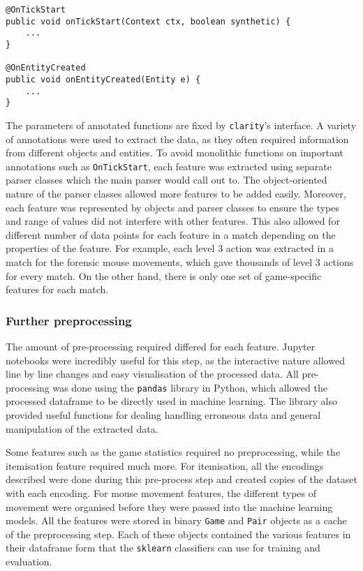 \documentclass[Report.tex]{subfiles}
\begin{document}
\begin{lstlisting}[caption=Annotations and function definitions for parsing must adhere to \texttt{clarity}'s interface.]
@OnTickStart
public void onTickStart(Context ctx, boolean synthetic) {
    ...
}

@OnEntityCreated
public void onEntityCreated(Entity e) {
    ...
}
\end{lstlisting}

The parameters of annotated functions are fixed by \texttt{clarity}'s interface. A variety of annotations were used to extract the data, as they often required information from different objects and entities. To avoid monolithic functions on important annotations such as \texttt{OnTickStart}, each feature was extracted using separate parser classes which the main parser would call out to. The object-oriented nature of the parser classes allowed more features to be added easily. Moreover, each feature was represented by objects and parser classes to ensure the types and range of values did not interfere with other features. This also allowed for different number of data points for each feature in a match depending on the properties of the feature. For example, each level 3 action was extracted in a match for the forensic mouse movements, which gave thousands of level 3 actions for every match. On the other hand, there is only one set of game-specific features for each match.

\subsubsection{Further preprocessing}
The amount of pre-processing required differed for each feature. 
Jupyter notebooks were incredibly useful for this step, as the interactive nature allowed line by line changes and easy visualisation of the processed data. All pre-processing was done using the \texttt{pandas} library in Python, which allowed the processed dataframe to be directly used in machine learning. The library also provided useful functions for dealing handling erroneous data and general manipulation of the extracted data. 

Some features such as the game statistics required no preprocessing, while the itemisation feature required much more. For itemisation, all the encodings described were done during this pre-process step and created copies of the dataset with each encoding. For mouse movement features, the different types of movement were organised before they were passed into the machine learning models. All the features were stored in binary \texttt{Game} and \texttt{Pair} objects as a cache of the preprocessing step. Each of these objects contained the various features in their dataframe form that the \texttt{sklearn} classifiers can use for training and evaluation. 
\end{document}
